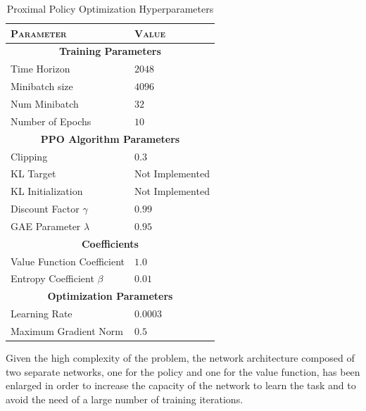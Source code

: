 \begin{table}[h]
    \centering
    \begin{tabular}{ll}
        \toprule
        \textsc{Parameter}          & \textsc{Value}          \\
        \midrule
        \multicolumn{2}{c}{\textbf{Training Parameters}}      \\
        Time Horizon                & $2048$                  \\
        Minibatch size              & $4096$                  \\
        Num Minibatch               & $32$                    \\
        Number of Epochs            & $10$                    \\
        \midrule
        \multicolumn{2}{c}{\textbf{PPO Algorithm Parameters}} \\
        Clipping                    & $0.3$                   \\
        KL Target                   & Not Implemented         \\
        KL Initialization           & Not Implemented         \\
        Discount Factor $\gamma$    & $0.99$                  \\
        GAE Parameter $\lambda$     & $0.95$                  \\
        \midrule
        \multicolumn{2}{c}{\textbf{Coefficients}}             \\
        Value Function Coefficient  & $1.0$                   \\
        Entropy Coefficient $\beta$ & $0.01$                  \\
        \midrule
        \multicolumn{2}{c}{\textbf{Optimization Parameters}}  \\
        Learning Rate               & $0.0003$                \\
        Maximum Gradient Norm       & $0.5$                   \\
        \bottomrule
    \end{tabular}
    \caption{Proximal Policy Optimization Hyperparameters}
    \label{tab:ppohyperparameters}
\end{table}

Given the high complexity of the problem, the network architecture composed of two separate networks, one for the policy and one for the value function, has been enlarged in order to increase the capacity of the network to learn the task and to avoid the need of a large number of training iterations.

